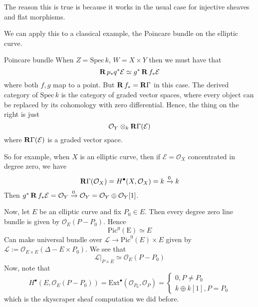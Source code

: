 The reason this is true is because it works in the usual case for injective sheaves and flat morphisms.


We can apply this to a classical example, the Poincare bundle on the elliptic curve.
\begin{example}{Poincare bundle}{}
When $Z=\mathrm{Spec}\,k$, $W=X\times Y$ then we must have that $$\operatorname{\mathbf{R}} p_{*}q^* \mathcal{E}\simeq g^* \operatorname{\mathbf{R}} f_{*}\mathcal{E}$$where both $f,g$ map to a point. But $\operatorname{\mathbf{R}} f_{*}=\operatorname{\mathbf{R}\Gamma}$ in this case. The derived category of $\mathrm{Spec}\,k$ is the category of graded vector spaces, where every object can be replaced by its cohomology with zero differential. Hence, the thing on the right is just $$\mathcal{O}_{Y}\otimes_{k} \operatorname{\mathbf{R}\Gamma} (\mathcal{E})$$where $\operatorname{\mathbf{R}\Gamma}(\mathcal{E})$ is a graded vector space.

So for example, when $X$ is an elliptic curve, then if $\mathcal{E}=\mathcal{O}_{X}$ concentrated in degree zero, we have $$\operatorname{\mathbf{R}\Gamma}(\mathcal{O}_{X})=H^\bullet(X,\mathcal{O}_{X})=k\xrightarrow{0}k$$Then $g^* \operatorname{\mathbf{R}} f_*\mathcal{E}= \mathcal{O}_{Y}\xrightarrow{0}\mathcal{O}_{Y}= \mathcal{O}_{Y}\oplus \mathcal{O}_{Y}[1]$. 

Now, let $E$ be an elliptic curve and fix $P_0\in E$. Then every degree zero line bundle is given by $\mathcal{O}_{E}(P-P_{0})$. Hence $$\mathrm{Pic^0(E)}\simeq E$$Can make universal bundle over $\mathcal{L}\xrightarrow{} \mathrm{Pic}^0(E)\times E$ given by $\mathcal{L}:=\mathcal{O}_{E\times E}(\Delta-E\times P_{0})$. We see that $$\mathcal{L}|_{P\times E}\simeq \mathcal{O}_{E}(P-P_{0})$$Now, note that $$H^\bullet (E, \mathcal{O}_{E}(P-P_{0}))=\mathrm{Ext}^\bullet(\mathcal{O}_{P_{0}},\mathcal{O}_{P})=\begin{cases}0, P\neq P_{0}\\ k\oplus k[1], P=P_{0}\end{cases} $$which is the skyscraper sheaf computation we did before.

\end{example}

